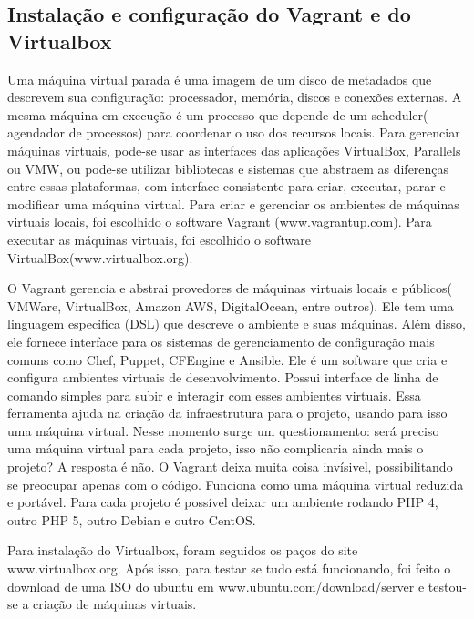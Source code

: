 \subsection{Instalação e configuração do Vagrant e do Virtualbox}

Uma máquina virtual parada é uma imagem de um disco 
de metadados que descrevem sua configuração: processador, 
memória, discos e conexões externas. A mesma máquina em 
execução é um processo que depende de um scheduler( agendador 
de processos) para coordenar o uso dos recursos locais. Para 
gerenciar máquinas virtuais, pode-se usar as interfaces das 
aplicações VirtualBox, Parallels ou VMW, ou pode-se utilizar 
bibliotecas e sistemas que abstraem as diferenças entre 
essas plataformas, com interface consistente para criar, 
executar, parar e modificar uma máquina virtual.
Para criar e gerenciar os ambientes de máquinas virtuais 
locais, foi escolhido o software Vagrant (www.vagrantup.com). 
Para executar as máquinas virtuais, foi escolhido o software 
VirtualBox(www.virtualbox.org).

O Vagrant gerencia e abstrai provedores de máquinas 
virtuais locais e públicos( VMWare, VirtualBox, Amazon 
AWS, DigitalOcean, entre outros). Ele tem uma linguagem 
especifica (DSL) que descreve o ambiente e suas máquinas. 
Além disso, ele fornece interface para os sistemas de 
gerenciamento de configuração mais comuns como Chef, 
Puppet, CFEngine e Ansible. Ele é um software que cria e 
configura ambientes 
virtuais de desenvolvimento. Possui interface de 
linha de comando simples para subir e interagir 
com esses ambientes virtuais. Essa ferramenta ajuda na 
criação da infraestrutura para o projeto, usando para 
isso uma máquina virtual. Nesse momento surge um questionamento: 
será preciso uma máquina virtual para cada projeto, isso não 
complicaria ainda mais o projeto? A resposta é não. O Vagrant 
deixa muita coisa invísivel, possibilitando se preocupar apenas 
com o código. Funciona como uma máquina virtual reduzida e 
portável. Para cada projeto é possível deixar 
um ambiente rodando PHP 4, outro PHP 5, outro Debian e outro 
CentOS.

Para instalação do Virtualbox, foram seguidos os paços do site  
www.virtualbox.org. Após isso, para testar se tudo está 
funcionando, foi feito o download de uma ISO do ubuntu 
em www.ubuntu.com/download/server e testou-se a criação 
de máquinas virtuais.

